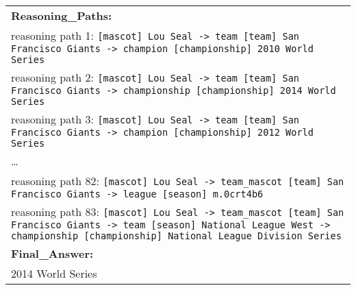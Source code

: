 \begin{table}[htbp]
\begin{tabular}{p{15cm}}
        \vspace{2mm} %
        \textbf{Reasoning\_Paths:} \\
        reasoning path 1: \texttt{[mascot] Lou Seal -> team [team] San Francisco Giants -> champion [championship] 2010 World Series} \\
        \vspace{1mm} %
        reasoning path 2: \texttt{[mascot] Lou Seal -> team [team] San Francisco Giants -> championship [championship] 2014 World Series} \\
        \vspace{1mm} %
        reasoning path 3: \texttt{[mascot] Lou Seal -> team [team] San Francisco Giants -> champion [championship] 2012 World Series} \\
        \dots \\
        
        reasoning path 82: \texttt{[mascot] Lou Seal -> team\_mascot [team] San Francisco Giants -> league [season] m.0crt4b6} \\
        \vspace{1mm} %
        reasoning path 83: \texttt{[mascot] Lou Seal -> team\_mascot [team] San Francisco Giants -> team [season] National League West -> championship [championship] National League Division Series} \\
        \vspace{2mm} %
        
        \textbf{Final\_Answer:} \\
        2014 World Series \\
        \bottomrule
    \end{tabular}
\end{table}

